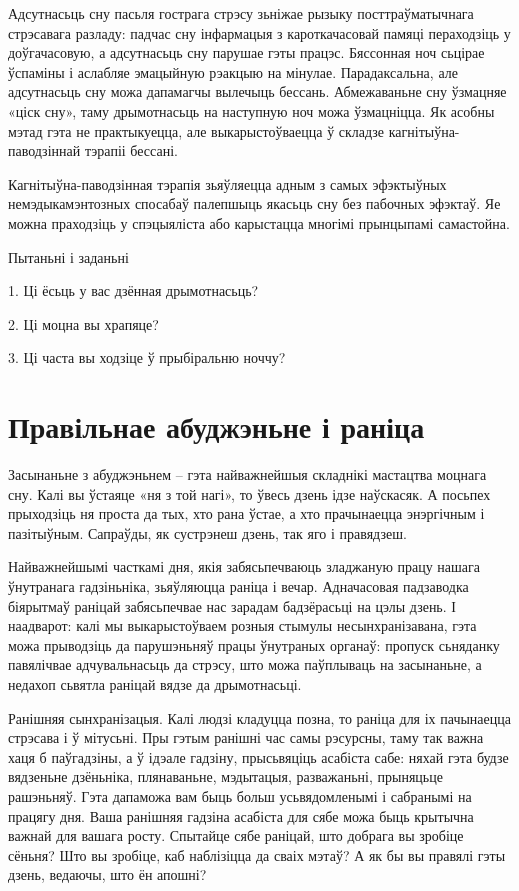 Адсутнасьць сну пасьля гострага стрэсу зьніжае рызыку посттраўматычнага стрэсавага разладу: падчас сну інфармацыя з кароткачасовай памяці пераходзіць у доўгачасовую, а адсутнасьць сну парушае гэты працэс. Бяссонная ноч сьцірае ўспаміны і аслабляе эмацыйную рэакцыю на мінулае. Парадаксальна, але адсутнасьць сну можа дапамагчы вылечыць бессань. Абмежаваньне сну ўзмацняе «ціск сну», таму дрымотнасьць на наступную ноч можа ўзмацніцца. Як асобны мэтад гэта не практыкуецца, але выкарыстоўваецца ў складзе кагнітыўна-паводзіннай тэрапіі бессані.

Кагнітыўна-паводзінная тэрапія зьяўляецца адным з самых эфэктыўных немэдыкамэнтозных спосабаў палепшыць якасьць сну без пабочных эфэктаў. Яе можна праходзіць у спэцыяліста або карыстацца многімі прынцыпамі самастойна.

Пытаньні і заданьні

1. Ці ёсьць у вас дзённая дрымотнасьць?

2. Ці моцна вы храпяце?

3. Ці часта вы ходзіце ў прыбіральню ноччу?


\section{Правільнае абуджэньне і раніца}

Засынаньне з абуджэньнем – гэта найважнейшыя складнікі мастацтва моцнага сну. Калі вы ўстаяце «ня з той нагі», то ўвесь дзень ідзе наўскасяк. А посьпех прыходзіць ня проста да тых, хто рана ўстае, а хто прачынаецца энэргічным і пазітыўным. Сапраўды, як сустрэнеш дзень, так яго і правядзеш.

Найважнейшымі часткамі дня, якія забясьпечваюць зладжаную працу нашага ўнутранага гадзіньніка, зьяўляюцца раніца і вечар. Адначасовая падзаводка біярытмаў раніцай забясьпечвае нас зарадам бадзёрасьці на цэлы дзень. І наадварот: калі мы выкарыстоўваем розныя стымулы несынхранізавана, гэта можа прыводзіць да парушэньняў працы ўнутраных органаў: пропуск сьняданку павялічвае адчувальнасьць да стрэсу, што можа паўплываць на засынаньне, а недахоп сьвятла раніцай вядзе да дрымотнасьці.

Ранішняя сынхранізацыя. Калі людзі кладуцца позна, то раніца для іх пачынаецца стрэсава і ў мітусьні. Пры гэтым ранішні час самы рэсурсны, таму так важна хаця б паўгадзіны, а ў ідэале гадзіну, прысьвяціць асабіста сабе: няхай гэта будзе вядзеньне дзёньніка, плянаваньне, мэдытацыя, разважаньні, прыняцьце рашэньняў. Гэта дапаможа вам быць больш усьвядомленымі і сабранымі на працягу дня. Ваша ранішняя гадзіна асабіста для сябе можа быць крытычна важнай для вашага росту. Спытайце сябе раніцай, што добрага вы зробіце сёньня? Што вы зробіце, каб наблізіцца да сваіх мэтаў? А як бы вы правялі гэты дзень, ведаючы, што ён апошні?

